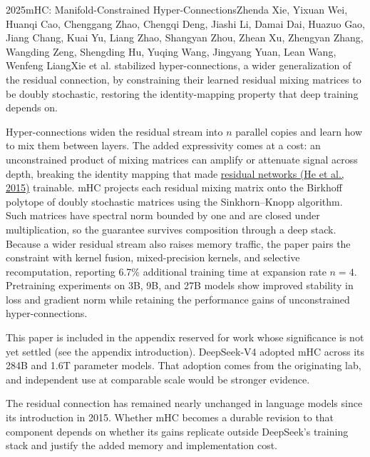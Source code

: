 
\begin{papersummary}{2025}{mHC: Manifold-Constrained Hyper-Connections}{Zhenda Xie, Yixuan Wei, Huanqi Cao, Chenggang Zhao, Chengqi Deng, Jiashi Li, Damai Dai, Huazuo Gao, Jiang Chang, Kuai Yu, Liang Zhao, Shangyan Zhou, Zhean Xu, Zhengyan Zhang, Wangding Zeng, Shengding Hu, Yuqing Wang, Jingyang Yuan, Lean Wang, Wenfeng Liang}{Xie et al. stabilized hyper-connections, a wider generalization of the residual connection, by constraining their learned residual mixing matrices to be doubly stochastic, restoring the identity-mapping property that deep training depends on.}

Hyper-connections widen the residual stream into $n$ parallel copies and learn how to mix them between layers. The added expressivity comes at a cost: an unconstrained product of mixing matrices can amplify or attenuate signal across depth, breaking the identity mapping that made \hyperref[paper:he-2015-resnet]{residual networks (He et al., 2015)} trainable. mHC projects each residual mixing matrix onto the Birkhoff polytope of doubly stochastic matrices using the Sinkhorn--Knopp algorithm. Such matrices have spectral norm bounded by one and are closed under multiplication, so the guarantee survives composition through a deep stack. Because a wider residual stream also raises memory traffic, the paper pairs the constraint with kernel fusion, mixed-precision kernels, and selective recomputation, reporting 6.7\% additional training time at expansion rate $n=4$. Pretraining experiments on 3B, 9B, and 27B models show improved stability in loss and gradient norm while retaining the performance gains of unconstrained hyper-connections.

This paper is included in the appendix reserved for work whose significance is not yet settled (see the appendix introduction). DeepSeek-V4 adopted mHC across its 284B and 1.6T parameter models. That adoption comes from the originating lab, and independent use at comparable scale would be stronger evidence.

The residual connection has remained nearly unchanged in language models since its introduction in 2015. Whether mHC becomes a durable revision to that component depends on whether its gains replicate outside DeepSeek's training stack and justify the added memory and implementation cost.

\end{papersummary}
